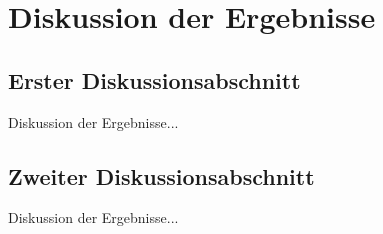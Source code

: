 \chapter{Diskussion der Ergebnisse}
\label{sec:disk}

\section{Erster Diskussionsabschnitt}

Diskussion der Ergebnisse...

\section{Zweiter Diskussionsabschnitt}

Diskussion der Ergebnisse...